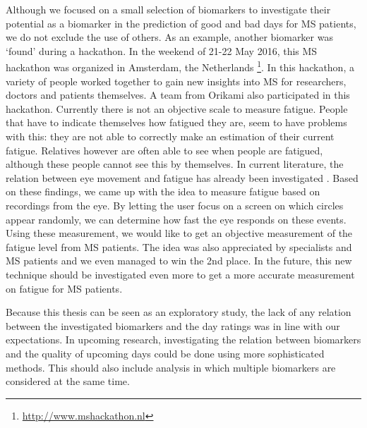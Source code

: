 Although we focused on a small selection of biomarkers to investigate their potential as a biomarker in the prediction of good and bad days for MS patients, we do not exclude the use of others.
As an example, another biomarker was `found' during a hackathon.
In the weekend of 21-22 May 2016, this MS hackathon was organized in Amsterdam, the Netherlands%
\footnote{\url{http://www.mshackathon.nl}}.
In this hackathon, a variety of people worked together to gain new insights into MS for researchers, doctors and patients themselves.
A team from Orikami also participated in this hackathon.
Currently there is not an objective scale to measure fatigue.
People that have to indicate themselves how fatigued they are, seem to have problems with this: they are not able to correctly make an estimation of their current fatigue.
Relatives however are often able to see when people are fatigued, although these people cannot see this by themselves.
In current literature, the relation between eye movement and fatigue has already been investigated \cite{Arief_2009}.
Based on these findings, we came up with the idea to measure fatigue based on recordings from the eye.
By letting the user focus on a screen on which circles appear randomly, we can determine how fast the eye responds on these events.
Using these measurement, we would like to get an objective measurement of the fatigue level from MS patients.
The idea was also appreciated by specialists and MS patients and we even managed to win the 2nd place.
In the future, this new technique should be investigated even more to get a more accurate measurement on fatigue for MS patients.

Because this thesis can be seen as an exploratory study, the lack of any relation between the investigated biomarkers and the day ratings was in line with our expectations.
In upcoming research, investigating the relation between biomarkers and the quality of upcoming days could be done using more sophisticated methods.
This should also include analysis in which multiple biomarkers are considered at the same time.